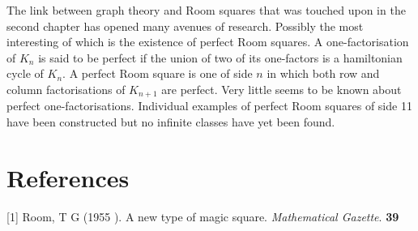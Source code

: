 \documentclass[
  12pt,
  a4paper]{book}
\begin{document}
The link between graph theory and Room squares that was touched upon in
the second chapter has opened many avenues of research. Possibly the
most interesting of which is the existence of perfect Room squares. A
one-factorisation of \(K_n\) is said to be perfect if the union of two of
its one-factors is a hamiltonian cycle of \(K_n\). A perfect Room square
is one of side \(n\) in which both row and column factorisations of
\(K_{n+1}\) are perfect. Very little seems to be known about perfect
one-factorisations. Individual examples of perfect Room squares of side
11 have been constructed but no infinite classes have yet been found.

\hypertarget{references}{%
\chapter*{References}\label{references}}

\hypertarget{refs}{}
\leavevmode\hypertarget{ref-room_new_1955}{}%
{[}1{]} Room, T G (1955 ). A new type of magic square. \emph{Mathematical Gazette}. \textbf{39}
\end{document}
